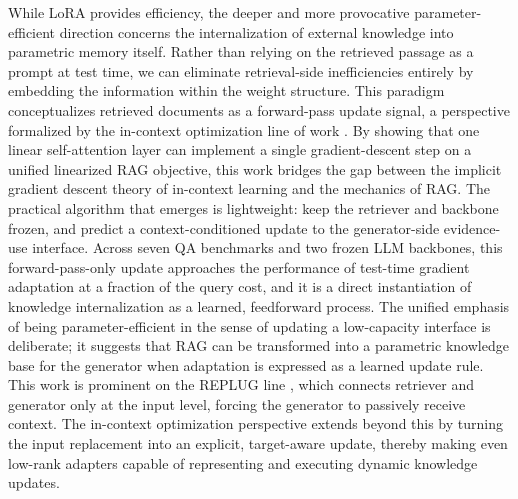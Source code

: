 \documentclass[11pt,a4paper]{article}
\begin{document}
While LoRA provides efficiency, the deeper and more provocative parameter-efficient direction concerns the internalization of external knowledge into parametric memory itself. Rather than relying on the retrieved passage as a prompt at test time, we can eliminate retrieval-side inefficiencies entirely by embedding the information within the weight structure. This paradigm conceptualizes retrieved documents as a forward-pass update signal, a perspective formalized by the in-context optimization line of work \cite{arxiv:2605.26356v1}. By showing that one linear self-attention layer can implement a single gradient-descent step on a unified linearized RAG objective, this work bridges the gap between the implicit gradient descent theory of in-context learning and the mechanics of RAG. The practical algorithm that emerges is lightweight: keep the retriever and backbone frozen, and predict a context-conditioned update to the generator-side evidence-use interface. Across seven QA benchmarks and two frozen LLM backbones, this forward-pass-only update approaches the performance of test-time gradient adaptation at a fraction of the query cost, and it is a direct instantiation of knowledge internalization as a learned, feedforward process. The unified emphasis of being parameter-efficient in the sense of updating a low-capacity interface is deliberate; it suggests that RAG can be transformed into a parametric knowledge base for the generator when adaptation is expressed as a learned update rule. This work is prominent on the REPLUG line \cite{arxiv:2301.12652v4}, which connects retriever and generator only at the input level, forcing the generator to passively receive context. The in-context optimization perspective extends beyond this by turning the input replacement into an explicit, target-aware update, thereby making even low-rank adapters capable of representing and executing dynamic knowledge updates.
\end{document}
